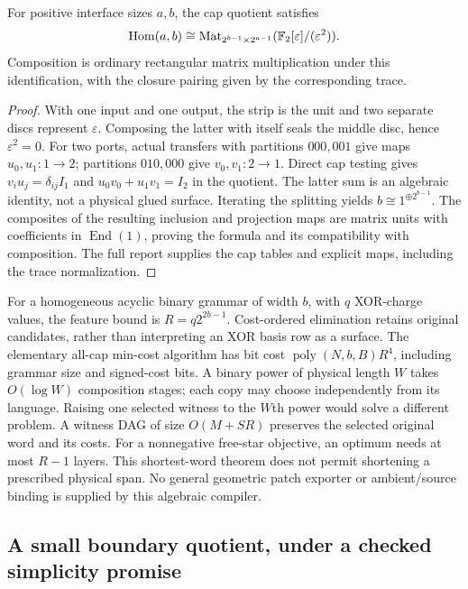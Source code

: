 \begin{proposition}
For positive interface sizes $a,b$, the cap quotient satisfies
\[
 \operatorname{Hom}(a,b)\cong
 \operatorname{Mat}_{2^{b-1}\times2^{a-1}}
                (\mathbb{F}_2[\varepsilon]/(\varepsilon^2)).
\]
Composition is ordinary rectangular matrix multiplication under this
identification, with the closure pairing given by the corresponding trace.
\end{proposition}
\begin{proof}
With one input and one output, the strip is the unit and two separate discs
represent $\varepsilon$. Composing the latter with itself seals the middle
disc, hence $\varepsilon^2=0$. For two ports, actual transfers with partitions
$000,001$ give maps $u_0,u_1:1\to2$; partitions $010,000$ give
$v_0,v_1:2\to1$. Direct cap testing gives
$v_i u_j=\delta_{ij}I_1$ and $u_0v_0+u_1v_1=I_2$ in the quotient.
The latter sum is an algebraic identity, not a physical glued surface.
Iterating the splitting yields $b\cong1^{\oplus2^{b-1}}$.
The composites of the resulting inclusion and projection maps are matrix
units with coefficients in $\operatorname{End}(1)$, proving the formula
and its compatibility with composition. The full report supplies the cap
tables and explicit maps, including the trace normalization.
\end{proof}

For a homogeneous acyclic binary grammar of width $b$, with $q$ XOR-charge
values, the feature bound is $R=q2^{2b-1}$. Cost-ordered elimination retains
original candidates, rather than interpreting an XOR basis row as a surface.
The elementary all-cap min-cost algorithm has bit cost
$\operatorname{poly}(N,b,B)R^4$, including grammar size and signed-cost bits.
A binary power of physical length $W$ takes $O(\log W)$ composition stages;
each copy may choose independently from its language. Raising one selected
witness to the $W$th power would solve a different problem. A witness DAG
of size $O(M+SR)$ preserves the selected original word and its costs.
For a nonnegative free-star objective, an optimum needs at most $R-1$
layers. This shortest-word theorem does not permit shortening a prescribed
physical span. No general geometric patch exporter or ambient/source binding
is supplied by this algebraic compiler.

\subsection{A small boundary quotient, under a checked simplicity promise}


